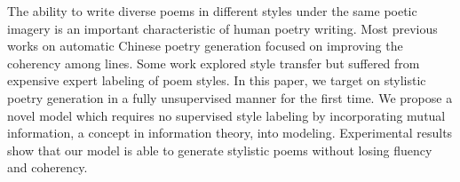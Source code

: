 The ability to write diverse poems in different styles under the same poetic imagery is an important characteristic of human poetry writing. Most previous works on automatic Chinese poetry generation focused on improving the coherency among lines. Some work explored style transfer but suffered from expensive expert labeling of poem styles. In this paper, we target on stylistic poetry generation in a fully unsupervised manner for the first time. We propose a novel model which requires no supervised style labeling by incorporating mutual information, a concept in information theory, into modeling. Experimental results show that our model is able to generate stylistic poems without losing fluency and coherency.
